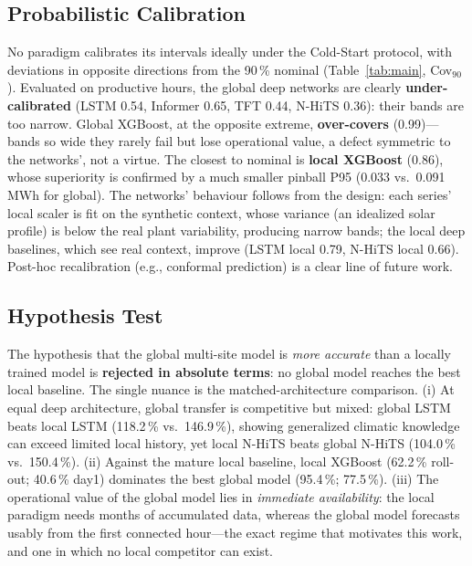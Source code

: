 \documentclass[conference]{IEEEtran}
\begin{document}
\subsection{Probabilistic Calibration}
No paradigm calibrates its intervals ideally under the Cold-Start protocol, with deviations
in opposite directions from the 90\,\% nominal (Table~\ref{tab:main}, Cov$_{90}$). Evaluated
on productive hours, the global deep networks are clearly \textbf{under-calibrated} (LSTM
0.54, Informer 0.65, TFT 0.44, N-HiTS 0.36): their bands are too narrow. Global XGBoost, at
the opposite extreme, \textbf{over-covers} (0.99)---bands so wide they rarely fail but lose
operational value, a defect symmetric to the networks', not a virtue. The closest to nominal
is \textbf{local XGBoost} (0.86), whose superiority is confirmed by a much smaller pinball
P95 (0.033 vs.\ 0.091\,MWh for global). The networks' behaviour follows from the design:
each series' local scaler is fit on the synthetic context, whose variance (an idealized
solar profile) is below the real plant variability, producing narrow bands; the local deep
baselines, which see real context, improve (LSTM local 0.79, N-HiTS local 0.66). Post-hoc
recalibration (e.g., conformal prediction) is a clear line of future work.

\subsection{Hypothesis Test}
The hypothesis that the global multi-site model is \emph{more accurate} than a locally
trained model is \textbf{rejected in absolute terms}: no global model reaches the best local
baseline. The single nuance is the matched-architecture comparison. (i) At equal deep
architecture, global transfer is competitive but mixed: global LSTM beats local LSTM
(118.2\,\% vs.\ 146.9\,\%), showing generalized climatic knowledge can exceed limited local
history, yet local N-HiTS beats global N-HiTS (104.0\,\% vs.\ 150.4\,\%). (ii) Against the
mature local baseline, local XGBoost (62.2\,\% roll-out; 40.6\,\% day1) dominates the best
global model (95.4\,\%; 77.5\,\%). (iii) The operational value of the global model lies in
\emph{immediate availability}: the local paradigm needs months of accumulated data, whereas
the global model forecasts usably from the first connected hour---the exact regime that
motivates this work, and one in which no local competitor can exist.
\end{document}
